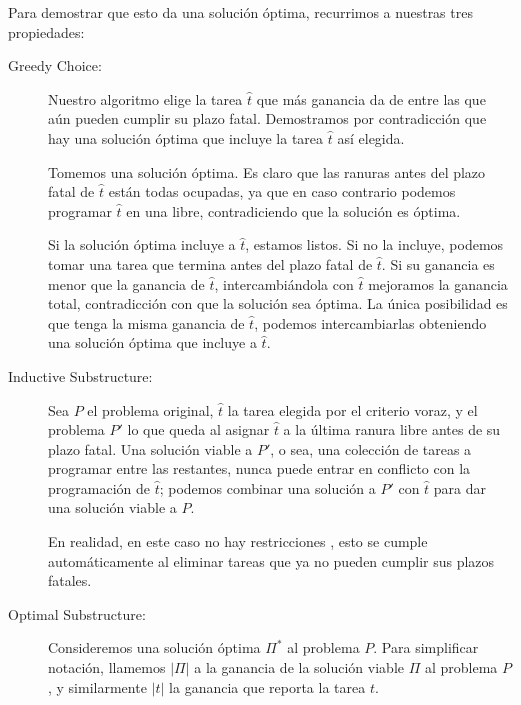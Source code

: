   Para demostrar que esto da una solución óptima,
  recurrimos a nuestras tres propiedades:
  \begin{description}
  \item[Greedy Choice:]
    Nuestro algoritmo elige la tarea \(\hat{t}\) que más ganancia da
    de entre las que aún pueden cumplir su plazo fatal.
    Demostramos por contradicción
    que hay una solución óptima que incluye la tarea \(\hat{t}\)
    así elegida.

    Tomemos una solución óptima.
    Es claro que las ranuras antes del plazo fatal de \(\hat{t}\)
    están todas ocupadas,
    ya que en caso contrario podemos programar \(\hat{t}\) en una libre,
    contradiciendo que la solución es óptima.

    Si la solución óptima incluye a \(\hat{t}\),
    estamos listos.
    Si no la incluye,
    podemos tomar una tarea
    que termina antes del plazo fatal de \(\hat{t}\).
    Si su ganancia es menor que la ganancia de \(\hat{t}\),
    intercambiándola con \(\hat{t}\) mejoramos la ganancia total,
    contradicción con que la solución sea óptima.
    La única posibilidad es que tenga la misma ganancia de \(\hat{t}\),
    podemos intercambiarlas obteniendo una solución óptima
    que incluye a \(\hat{t}\).
  \item[Inductive Substructure:]
    Sea \(P\) el problema original,
    \(\hat{t}\) la tarea elegida por el criterio voraz,
    y el problema \(P'\) lo que queda
    al asignar \(\hat{t}\) a la última ranura libre
    antes de su plazo fatal.
    Una solución viable a \(P'\),
    o sea,
    una colección de tareas a programar entre las restantes,
    nunca puede entrar en conflicto con la programación de \(\hat{t}\);
    podemos combinar una solución a \(P'\) con \(\hat{t}\)
    para dar una solución viable a \(P\).

    En realidad,
    en este caso no hay restricciones ,
    esto se cumple automáticamente al eliminar tareas
    que ya no pueden cumplir sus plazos fatales.
  \item[Optimal Substructure:]
    Consideremos una solución óptima \(\Pi^*\) al problema \(P\).
    Para simplificar notación,
    llamemos \(\lvert \Pi \rvert\)
    a la ganancia de la solución viable \(\Pi\)
    al problema \(P\),
    y similarmente \(\lvert t \rvert\)
    la ganancia que reporta la tarea \(t\).


\end{description}
